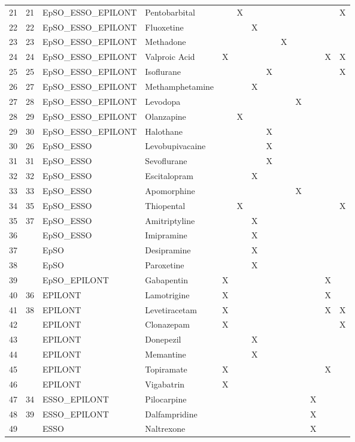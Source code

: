 \begin{table}[ht]
\begin{tabular}{rllllllllllll}
  21 & 21 & EpSO\_ESSO\_EPILONT & Pentobarbital &  & X &  &  &  &  &  &  & X \\ 
  22 & 22 & EpSO\_ESSO\_EPILONT & Fluoxetine &  &  & X &  &  &  &  &  &  \\ 
  23 & 23 & EpSO\_ESSO\_EPILONT & Methadone &  &  &  &  & X &  &  &  &  \\ 
  24 & 24 & EpSO\_ESSO\_EPILONT & Valproic Acid & X &  &  &  &  &  &  & X & X \\ 
  25 & 25 & EpSO\_ESSO\_EPILONT & Isoflurane &  &  &  & X &  &  &  &  & X \\ 
  26 & 27 & EpSO\_ESSO\_EPILONT & Methamphetamine &  &  & X &  &  &  &  &  &  \\ 
  27 & 28 & EpSO\_ESSO\_EPILONT & Levodopa &  &  &  &  &  & X &  &  &  \\ 
  28 & 29 & EpSO\_ESSO\_EPILONT & Olanzapine &  & X &  &  &  &  &  &  &  \\ 
  29 & 30 & EpSO\_ESSO\_EPILONT & Halothane &  &  &  & X &  &  &  &  &  \\ 
  30 & 26 & EpSO\_ESSO & Levobupivacaine &  &  &  & X &  &  &  &  &  \\ 
  31 & 31 & EpSO\_ESSO & Sevoflurane &  &  &  & X &  &  &  &  &  \\ 
  32 & 32 & EpSO\_ESSO & Escitalopram &  &  & X &  &  &  &  &  &  \\ 
  33 & 33 & EpSO\_ESSO & Apomorphine &  &  &  &  &  & X &  &  &  \\ 
  34 & 35 & EpSO\_ESSO & Thiopental &  & X &  &  &  &  &  &  & X \\ 
  35 & 37 & EpSO\_ESSO & Amitriptyline &  &  & X &  &  &  &  &  &  \\ 
  36 &  & EpSO\_ESSO & Imipramine &  &  & X &  &  &  &  &  &  \\ 
  37 &  & EpSO & Desipramine &  &  & X &  &  &  &  &  &  \\ 
  38 &  & EpSO & Paroxetine &  &  & X &  &  &  &  &  &  \\ 
  39 &  & EpSO\_EPILONT & Gabapentin & X &  &  &  &  &  &  & X &  \\ 
  40 & 36 & EPILONT & Lamotrigine & X &  &  &  &  &  &  & X &  \\ 
  41 & 38 & EPILONT & Levetiracetam & X &  &  &  &  &  &  & X & X \\ 
  42 &  & EPILONT & Clonazepam & X &  &  &  &  &  &  &  & X \\ 
  43 &  & EPILONT & Donepezil &  &  & X &  &  &  &  &  &  \\ 
  44 &  & EPILONT & Memantine &  &  & X &  &  &  &  &  &  \\ 
  45 &  & EPILONT & Topiramate & X &  &  &  &  &  &  & X &  \\ 
  46 &  & EPILONT & Vigabatrin & X &  &  &  &  &  &  &  &  \\ 
  47 & 34 & ESSO\_EPILONT & Pilocarpine &  &  &  &  &  &  & X &  &  \\ 
  48 & 39 & ESSO\_EPILONT & Dalfampridine &  &  &  &  &  &  & X &  &  \\ 
  49 &  & ESSO & Naltrexone &  &  &  &  &  &  & X &  &  \\ 
   \hline
\end{tabular}
\end{table}
